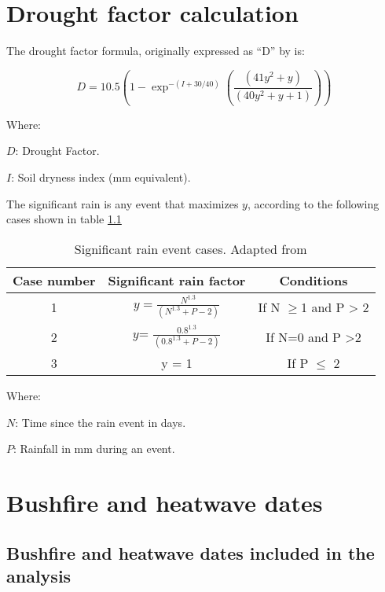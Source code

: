 \appendix

\chapter{Drought factor calculation}

The drought factor formula, originally expressed as \textquotedblleft D\textquotedblright{}
by \citet{Griffiths1999} is:

\begin{equation}
D=10.5\left(1-\exp^{-\left(I+30/40\right)}\left(\frac{\left(41y^{2}+y\right)}{\left(40y^{2}+y+1\right)}\right)\right)
\end{equation}


Where:

$D$: Drought Factor. 

$I$: Soil dryness index (mm equivalent). 

The significant rain is any event that maximizes $y$, according to
the following cases shown in table \ref{tab:Significant-rain-event}

\begin{table}[h]
\caption[Significant rain event cases for drought factor calculation]{Significant rain event cases. Adapted from \citet{Griffiths1999}
\label{tab:Significant-rain-event}}


\noindent \centering{}%
\begin{tabular}{|c|c|c|}
\hline 
Case number & Significant rain factor & Conditions\tabularnewline
\hline 
\hline 
1 & $y=\frac{N^{1.3}}{\left(N^{1.3}+P-2\right)}$ & If N $\geq$1 and P > 2\tabularnewline
\hline 
2 & $y$= $\frac{0.8^{1.3}}{\left(0.8^{1.3}+P-2\right)}$ & If N=0 and P >2\tabularnewline
\hline 
3 & y = 1 & If P $\leq$ 2\tabularnewline
\hline 
\end{tabular}
\end{table}


Where: 

$N$: Time since the rain event in days. 

$P$: Rainfall in mm during an event. 


\chapter{Bushfire and heatwave dates}

\newpage{}


\section{Bushfire and heatwave dates included in the analysis}


